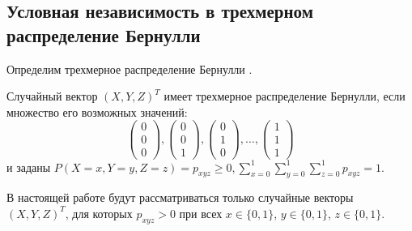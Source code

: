 \subsection{Условная независимость в трехмерном распределение Бернулли}\label{ci_and_bernoulli}

Определим трехмерное распределение Бернулли \cite{Dai2013, Teugels1990}.
\begin{definition}
    Случайный вектор $(X,Y,Z)^T$ имеет трехмерное распределение Бернулли,
    если множество его возможных значений:
    $$
        \begin{pmatrix}
            0 \\
            0 \\
            0
        \end{pmatrix},
        \begin{pmatrix}
            0 \\
            0 \\
            1
        \end{pmatrix},
        \begin{pmatrix}
            0 \\
            1 \\
            0
        \end{pmatrix}, \ldots, \begin{pmatrix}
            1 \\
            1 \\
            1
        \end{pmatrix}
    $$ и заданы $P(X=x,Y=y,Z=z)=p_{xyz} \geq 0,  \sum_{x=0}^1 \sum_{y=0}^1 \sum_{z=0}^1 p_{xyz} =1$.
\end{definition}
В настоящей работе будут рассматриваться
только случайные векторы $(X,Y,Z)^T$, для которых
$p_{xyz}>0$ при всех 
$x \in \{0,1\}$, $y\in \{0,1\}$, $z\in \{0,1\}$.

